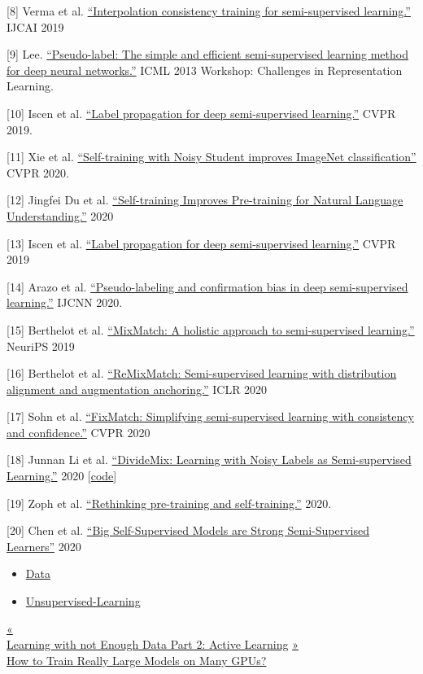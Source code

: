 {[}8{]} Verma et al. \href{https://arxiv.org/abs/1903.03825}{``Interpolation consistency training for semi-supervised learning.''} IJCAI 2019

{[}9{]} Lee. \href{http://citeseerx.ist.psu.edu/viewdoc/download?doi=10.1.1.664.3543&rep=rep1&type=pdf}{``Pseudo-label: The simple and efficient semi-supervised learning method for deep neural networks.''} ICML 2013 Workshop: Challenges in Representation Learning.

{[}10{]} Iscen et al. \href{https://arxiv.org/abs/1904.04717}{``Label propagation for deep semi-supervised learning.''} CVPR 2019.

{[}11{]} Xie et al. \href{https://arxiv.org/abs/1911.04252}{``Self-training with Noisy Student improves ImageNet classification''} CVPR 2020.

{[}12{]} Jingfei Du et al. \href{https://arxiv.org/abs/2010.02194}{``Self-training Improves Pre-training for Natural Language Understanding.''} 2020

{[}13{]} Iscen et al. \href{https://arxiv.org/abs/1904.04717}{``Label propagation for deep semi-supervised learning.''} CVPR 2019

{[}14{]} Arazo et al. \href{https://arxiv.org/abs/1908.02983}{``Pseudo-labeling and confirmation bias in deep semi-supervised learning.''} IJCNN 2020.

{[}15{]} Berthelot et al. \href{https://arxiv.org/abs/1905.02249}{``MixMatch: A holistic approach to semi-supervised learning.''} NeuriPS 2019

{[}16{]} Berthelot et al. \href{https://arxiv.org/abs/1911.09785}{``ReMixMatch: Semi-supervised learning with distribution alignment and augmentation anchoring.''} ICLR 2020

{[}17{]} Sohn et al. \href{https://arxiv.org/abs/2001.07685}{``FixMatch: Simplifying semi-supervised learning with consistency and confidence.''} CVPR 2020

{[}18{]} Junnan Li et al. \href{https://arxiv.org/abs/2002.07394}{``DivideMix: Learning with Noisy Labels as Semi-supervised Learning.''} 2020 {[}\href{https://github.com/LiJunnan1992/DivideMix}{code}{]}

{[}19{]} Zoph et al. \href{https://arxiv.org/abs/2006.06882}{``Rethinking pre-training and self-training.''} 2020.

{[}20{]} Chen et al. \href{https://arxiv.org/abs/2006.10029}{``Big Self-Supervised Models are Strong Semi-Supervised Learners''} 2020

\begin{itemize}
\tightlist
\item
  \href{https://lilianweng.github.io/tags/data/}{Data}
\item
  \href{https://lilianweng.github.io/tags/unsupervised-learning/}{Unsupervised-Learning}
\end{itemize}

\href{https://lilianweng.github.io/posts/2022-02-20-active-learning/}{{« }\\
{Learning with not Enough Data Part 2: Active Learning}} \href{https://lilianweng.github.io/posts/2021-09-25-train-large/}{{ »}\\
{How to Train Really Large Models on Many GPUs?}}

